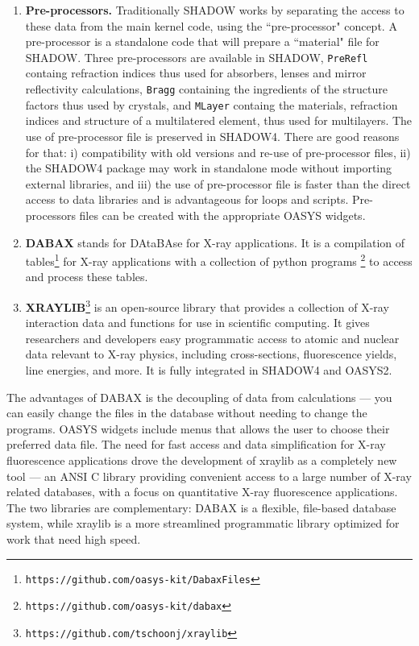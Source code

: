 \begin{enumerate}
    \item {\bf Pre-processors.} Traditionally SHADOW works by separating the access to these data from the main kernel code, using the ``pre-processor" concept. A pre-processor is a standalone code that will prepare a ``material" file for SHADOW. Three pre-processors are available in SHADOW, {\tt PreRefl} containg refraction indices thus used for absorbers, lenses and mirror reflectivity calculations, {\tt Bragg} containing the ingredients of the structure factors thus used by crystals, and {\tt MLayer} containg the materials, refraction indices and structure of a multilatered element, thus used for multilayers.
    The use of pre-processor file is preserved in SHADOW4. There are good reasons for that: i) compatibility with old versions and re-use of pre-processor files, ii) the SHADOW4 package may work in standalone mode without importing external libraries, and iii) the use of pre-processor file is faster than the direct access to data libraries and is advantageous for loops and scripts.
    Pre-processors files can be created with the appropriate OASYS widgets. 
    \item {\bf DABAX} stands for DAtaBAse for X-ray applications. It is a compilation of tables\footnote{\tt https://github.com/oasys-kit/DabaxFiles} for X-ray applications with a collection of python programs
    \footnote{\tt https://github.com/oasys-kit/dabax}
    to access and process these tables.
    \item {\bf XRAYLIB}\footnote{\tt https://github.com/tschoonj/xraylib} \cite{Schoonjans2011} is an open-source library that provides a collection of X-ray interaction data and functions for use in scientific computing. It gives researchers and developers easy programmatic access to atomic and nuclear data relevant to X-ray physics, including cross-sections, fluorescence yields, line energies, and more. It is fully integrated in SHADOW4 and OASYS2.
\end{enumerate}


The advantages of DABAX is the decoupling of data from calculations — you can easily change the files in the database without needing to change the programs. OASYS widgets include menus that allows the user to choose their preferred data file. The need for fast access and data simplification for X-ray fluorescence applications drove the development of xraylib as a completely new tool — an ANSI C library providing convenient access to a large number of X-ray related databases, with a focus on quantitative X-ray fluorescence applications. The two libraries are complementary: DABAX is a flexible, file-based database system, while xraylib is a more streamlined programmatic library optimized for work that need high speed.

